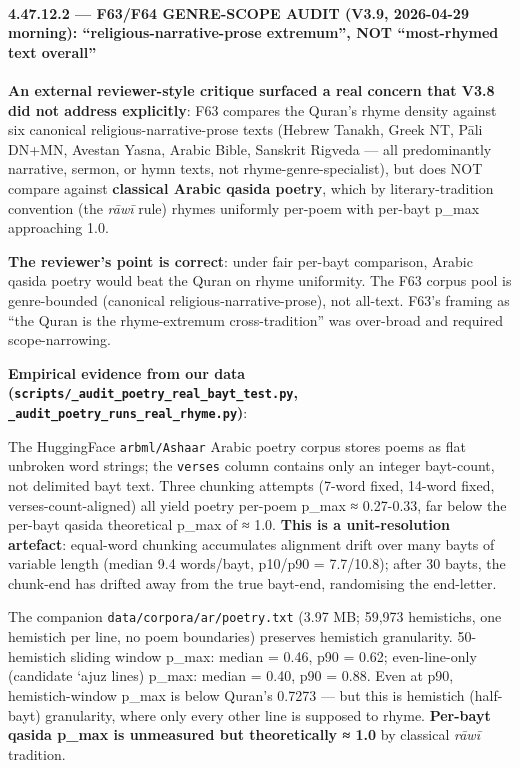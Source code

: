 \documentclass[
]{article}
\begin{document}
\paragraph{4.47.12.2 --- F63/F64 GENRE-SCOPE AUDIT (V3.9, 2026-04-29
morning): ``religious-narrative-prose extremum'', NOT ``most-rhymed text
overall''}\label{f63f64-genre-scope-audit-v3.9-2026-04-29-morning-religious-narrative-prose-extremum-not-most-rhymed-text-overall}

\textbf{An external reviewer-style critique surfaced a real concern that
V3.8 did not address explicitly}: F63 compares the Quran's rhyme density
against six canonical religious-narrative-prose texts (Hebrew Tanakh,
Greek NT, Pāli DN+MN, Avestan Yasna, Arabic Bible, Sanskrit Rigveda ---
all predominantly narrative, sermon, or hymn texts, not
rhyme-genre-specialist), but does NOT compare against \textbf{classical
Arabic qasida poetry}, which by literary-tradition convention (the
\emph{rāwī} rule) rhymes uniformly per-poem with per-bayt p\_max
approaching 1.0.

\textbf{The reviewer's point is correct}: under fair per-bayt
comparison, Arabic qasida poetry would beat the Quran on rhyme
uniformity. The F63 corpus pool is genre-bounded (canonical
religious-narrative-prose), not all-text. F63's framing as ``the Quran
is the rhyme-extremum cross-tradition'' was over-broad and required
scope-narrowing.

\textbf{Empirical evidence from our data
(\texttt{scripts/\_audit\_poetry\_real\_bayt\_test.py},
\texttt{\_audit\_poetry\_runs\_real\_rhyme.py})}:

The HuggingFace \texttt{arbml/Ashaar} Arabic poetry corpus stores poems
as flat unbroken word strings; the \texttt{verses} column contains only
an integer bayt-count, not delimited bayt text. Three chunking attempts
(7-word fixed, 14-word fixed, verses-count-aligned) all yield poetry
per-poem p\_max ≈ 0.27-0.33, far below the per-bayt qasida theoretical
p\_max of ≈ 1.0. \textbf{This is a unit-resolution artefact}: equal-word
chunking accumulates alignment drift over many bayts of variable length
(median 9.4 words/bayt, p10/p90 = 7.7/10.8); after 30 bayts, the
chunk-end has drifted away from the true bayt-end, randomising the
end-letter.

The companion \texttt{data/corpora/ar/poetry.txt} (3.97 MB; 59,973
hemistichs, one hemistich per line, no poem boundaries) preserves
hemistich granularity. 50-hemistich sliding window p\_max: median =
0.46, p90 = 0.62; even-line-only (candidate `ajuz lines) p\_max: median
= 0.40, p90 = 0.88. Even at p90, hemistich-window p\_max is below
Quran's 0.7273 --- but this is hemistich (half-bayt) granularity, where
only every other line is supposed to rhyme. \textbf{Per-bayt qasida
p\_max is unmeasured but theoretically ≈ 1.0} by classical \emph{rāwī}
tradition.
\end{document}
